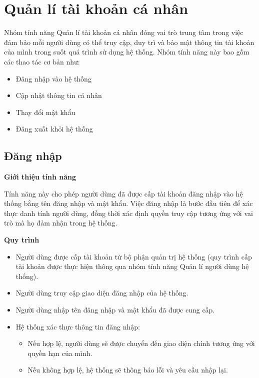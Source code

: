 \section{Quản lí tài khoản cá nhân}

Nhóm tính năng Quản lí tài khoản cá nhân đóng vai trò trung tâm trong việc đảm bảo mỗi người dùng có thể truy cập, duy trì và bảo mật thông tin tài khoản của mình trong suốt quá trình sử dụng hệ thống. Nhóm tính năng này bao gồm các thao tác cơ bản như:
\begin{itemize}
  \item Đăng nhập vào hệ thống
  \item Cập nhật thông tin cá nhân
  \item Thay đổi mật khẩu
  \item Đăng xuất khỏi hệ thống
\end{itemize}

\subsection{Đăng nhập}

\noindent \textbf{Giới thiệu tính năng}

Tính năng này cho phép người dùng đã được cấp tài khoản đăng nhập vào hệ thống bằng tên đăng nhập và mật khẩu. Việc đăng nhập là bước đầu tiên để xác thực danh tính người dùng, đồng thời xác định quyền truy cập tương ứng với vai trò mà họ đảm nhận trong hệ thống.

\noindent \textbf{Quy trình}

\begin{itemize}

  \item Người dùng được cấp tài khoản từ bộ phận quản trị hệ thống (quy trình cấp tài khoản được thực hiện thông qua nhóm tính năng Quản lí người dùng hệ thống).

  \item Người dùng truy cập giao diện đăng nhập của hệ thống.

  \item Người dùng nhập tên đăng nhập và mật khẩu đã được cung cấp.

  \item Hệ thống xác thực thông tin đăng nhập:
    \begin{itemize}
      \item Nếu hợp lệ, người dùng sẽ được chuyển đến giao diện chính tương ứng với quyền hạn của mình.
      \item Nếu không hợp lệ, hệ thống sẽ thông báo lỗi và yêu cầu nhập lại.
    \end{itemize}

\end{itemize}

